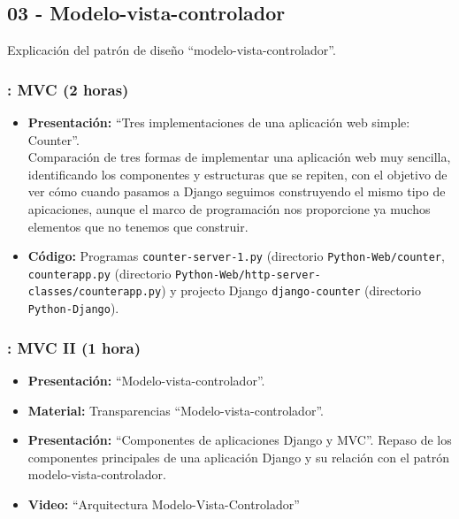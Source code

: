 \documentclass[a4paper,12pt]{article}
\begin{document}
\subsection{03 - Modelo-vista-controlador}

Explicación del patrón de diseño ``modelo-vista-controlador''.

\subsubsection{\juevesH: MVC (2 horas)}
\label{cal:juevesH}

\begin{itemize}
\item \textbf{Presentación:} ``Tres implementaciones de una aplicación web simple: Counter''. \\
  Comparación de tres formas de implementar una aplicación web muy sencilla, identificando los componentes y estructuras que se repiten, con el objetivo de ver cómo cuando pasamos a Django seguimos construyendo el mismo tipo de apicaciones, aunque el marco de programación nos proporcione ya muchos elementos que no tenemos que construir.
\item \textbf{Código:} Programas \verb|counter-server-1.py| (directorio \verb|Python-Web/counter|, \verb|counterapp.py| (directorio \verb|Python-Web/http-server-classes/counterapp.py|) y projecto Django \verb|django-counter| (directorio \verb|Python-Django|).
%

\end{itemize}

\subsubsection{\juevesI: MVC II (1 hora)}
\label{cal:juevesI}


\begin{itemize}
\item \textbf{Presentación:} ``Modelo-vista-controlador''.
\item \textbf{Material:} Transparencias ``Modelo-vista-controlador''.
\item \textbf{Presentación:} ``Componentes de aplicaciones Django y MVC''.
  Repaso de los componentes principales de una aplicación Django y su relación con el patrón modelo-vista-controlador.
\item \textbf{Video:} ``Arquitectura Modelo-Vista-Controlador''
\end{itemize}
\end{document}
